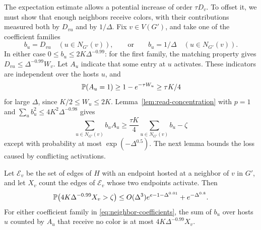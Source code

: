 The expectation estimate allows a potential increase of order
$\tau D_v$.  To offset it, we must show that enough neighbors receive
colors, with their contributions measured both by $D_{vu}$ and by
$1/\Delta$.  Fix $v\in V(G')$, and take one of the coefficient families
\begin{equation}\label{eq:neighbor-coefficients}
 b_u=D_{vu}\quad(u\in N_{G'}(v)),\qquad\text{or}\qquad
 b_u=1/\Delta\quad(u\in N_{G'}(v)).
\end{equation}
In either case $0\le b_u\le2K\Delta^{-0.99}$: for the first family,
the matching property gives $D_{vu}\le\Delta^{-0.99}W_v$.
Let $A_u$ indicate that some entry at $u$ activates.  These indicators
are independent over the hosts $u$, and
\begin{equation}\label{eq:host-activation-probability}
 \mathbb P(A_u=1)\ge1-e^{-\tau W_u}\ge\tau K/4
\end{equation}
for large $\Delta$, since $K/2\le W_u\le2K$.
Lemma~\ref{lem:read-concentration} with $p=1$ and
$\sum_ub_u^2\le4K^2\Delta^{-0.98}$ gives
\begin{equation}\label{eq:activated-neighbor-mass}
 \sum_{u\in N_{G'}(v)}b_uA_u
 \ge\frac{\tau K}{4}\sum_{u\in N_{G'}(v)}b_u-\zeta
\end{equation}
except with probability at most $\exp(-\Delta^{0.5})$.
The next lemma bounds the loss caused by conflicting activations.

\begin{lemma}\label{lem:activation-collisions}
Let $\mathcal E_v$ be the set of edges of $H$ with an endpoint hosted
at a neighbor of $v$ in $G'$, and let $X_v$ count the edges of
$\mathcal E_v$ whose two endpoints activate.  Then
\begin{equation}\label{eq:collision-tail}
 \mathbb P\bigl(4K\Delta^{-0.99}X_v>\zeta\bigr)
 \le O(\Delta^3)e^{e-1-\Delta^{0.01}}+e^{-\Delta^{0.8}}.
\end{equation}
For either coefficient family in \eqref{eq:neighbor-coefficients},
the sum of $b_u$ over hosts $u$ counted by $A_u$ that receive no
color is at most $4K\Delta^{-0.99}X_v$.
\end{lemma}

